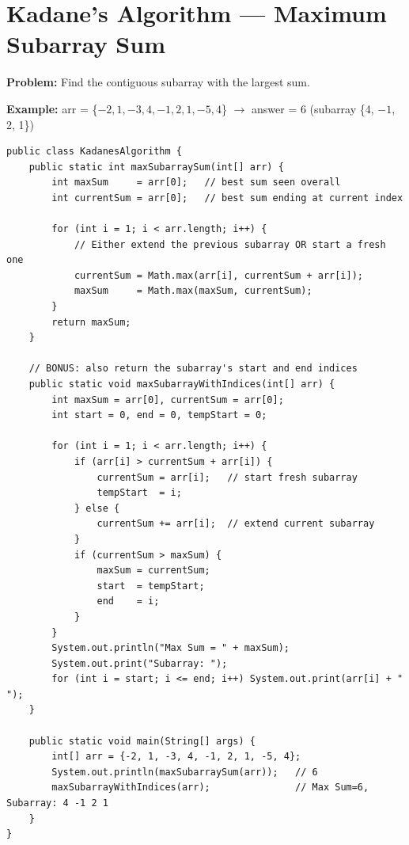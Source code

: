 \documentclass[12pt,a4paper,oneside]{book}
\begin{document}
\section{Kadane's Algorithm --- Maximum Subarray Sum}

\textbf{Problem:} Find the contiguous subarray with the largest sum.

\textbf{Example:} arr = \{$-2, 1, -3, 4, -1, 2, 1, -5, 4$\} $\to$ answer = 6 (subarray \{4, $-1$, 2, 1\})

\begin{lstlisting}[caption={Kadane's Algorithm --- O(n) time O(1) space}]
public class KadanesAlgorithm {
    public static int maxSubarraySum(int[] arr) {
        int maxSum     = arr[0];   // best sum seen overall
        int currentSum = arr[0];   // best sum ending at current index

        for (int i = 1; i < arr.length; i++) {
            // Either extend the previous subarray OR start a fresh one
            currentSum = Math.max(arr[i], currentSum + arr[i]);
            maxSum     = Math.max(maxSum, currentSum);
        }
        return maxSum;
    }

    // BONUS: also return the subarray's start and end indices
    public static void maxSubarrayWithIndices(int[] arr) {
        int maxSum = arr[0], currentSum = arr[0];
        int start = 0, end = 0, tempStart = 0;

        for (int i = 1; i < arr.length; i++) {
            if (arr[i] > currentSum + arr[i]) {
                currentSum = arr[i];   // start fresh subarray
                tempStart  = i;
            } else {
                currentSum += arr[i];  // extend current subarray
            }
            if (currentSum > maxSum) {
                maxSum = currentSum;
                start  = tempStart;
                end    = i;
            }
        }
        System.out.println("Max Sum = " + maxSum);
        System.out.print("Subarray: ");
        for (int i = start; i <= end; i++) System.out.print(arr[i] + " ");
    }

    public static void main(String[] args) {
        int[] arr = {-2, 1, -3, 4, -1, 2, 1, -5, 4};
        System.out.println(maxSubarraySum(arr));   // 6
        maxSubarrayWithIndices(arr);               // Max Sum=6, Subarray: 4 -1 2 1
    }
}
\end{lstlisting}
\end{document}
